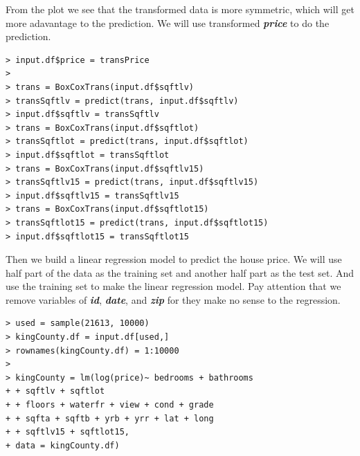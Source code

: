 \documentclass{article}%
\begin{document}
From the plot we see that the transformed data is more symmetric, which will get more adavantage to the prediction. We will use transformed  \emph{\textbf{price}} to do the prediction.
\begin{verbatim}
> input.df$price = transPrice
>
> trans = BoxCoxTrans(input.df$sqftlv)
> transSqftlv = predict(trans, input.df$sqftlv)
> input.df$sqftlv = transSqftlv
> trans = BoxCoxTrans(input.df$sqftlot)
> transSqftlot = predict(trans, input.df$sqftlot)
> input.df$sqftlot = transSqftlot
> trans = BoxCoxTrans(input.df$sqftlv15)
> transSqftlv15 = predict(trans, input.df$sqftlv15)
> input.df$sqftlv15 = transSqftlv15
> trans = BoxCoxTrans(input.df$sqftlot15)
> transSqftlot15 = predict(trans, input.df$sqftlot15)
> input.df$sqftlot15 = transSqftlot15
\end{verbatim}

Then we build a linear regression model to predict the house price. We will use half part of the data as the training set and another half part as the test set. And use the training set to make the linear regression model. Pay attention that we remove variables of  \emph{\textbf{id}},  \emph{\textbf{date}},  and \emph{\textbf{zip}} for they make no sense to the regression.
\begin{verbatim}
> used = sample(21613, 10000)
> kingCounty.df = input.df[used,]
> rownames(kingCounty.df) = 1:10000
>
> kingCounty = lm(log(price)~ bedrooms + bathrooms
+ + sqftlv + sqftlot
+ + floors + waterfr + view + cond + grade
+ + sqfta + sqftb + yrb + yrr + lat + long
+ + sqftlv15 + sqftlot15,
+ data = kingCounty.df)
\end{verbatim}
\end{document}
